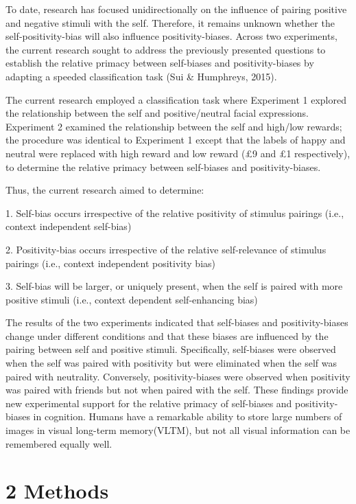 \documentclass[
  man]{apa6}
\begin{document}
To date, research has focused unidirectionally on the influence of pairing positive and negative stimuli with the self. Therefore, it remains unknown whether the self-positivity-bias will also influence positivity-biases. Across two experiments, the current research sought to address the previously presented questions to establish the relative primacy between self-biases and positivity-biases by adapting a speeded classification task (Sui \& Humphreys, 2015).

The current research employed a classification task where Experiment 1 explored the relationship between the self and positive/neutral facial expressions. Experiment 2 examined the relationship between the self and high/low rewards; the procedure was identical to Experiment 1 except that the labels of happy and neutral were replaced with high reward and low reward (£9 and £1 respectively), to determine the relative primacy between self-biases and positivity-biases.

Thus, the current research aimed to determine:

1. Self-bias occurs irrespective of the relative positivity of stimulus pairings (i.e., context independent self-bias)

2. Positivity-bias occurs irrespective of the relative self-relevance of stimulus pairings (i.e., context independent positivity bias)

3. Self-bias will be larger, or uniquely present, when the self is paired with more positive stimuli (i.e., context dependent self-enhancing bias)

The results of the two experiments indicated that self-biases and positivity-biases change under different conditions and that these biases are influenced by the pairing between self and positive stimuli. Specifically, self-biases were observed when the self was paired with positivity but were eliminated when the self was paired with neutrality. Conversely, positivity-biases were observed when positivity was paired with friends but not when paired with the self. These findings provide new experimental support for the relative primacy of self-biases and positivity-biases in cognition. Humans have a remarkable ability to store large numbers of images in visual long-term memory(VLTM), but not all visual information can be remembered equally well.

\section{2 Methods}\label{methods}
\end{document}
